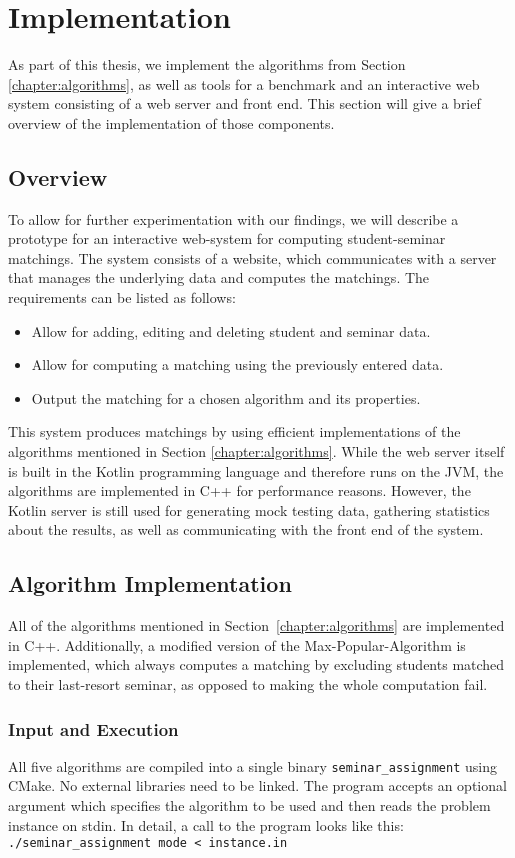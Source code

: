 \section{Implementation}

As part of this thesis, we implement the algorithms from Section \ref{chapter:algorithms}, as well as tools for a benchmark and an interactive web system consisting of a web server and front end. This section will give a brief overview of the implementation of those components.

\subsection{Overview}
To allow for further experimentation with our findings, we will describe a prototype for an interactive web-system for computing student-seminar matchings. The system consists of a website, which communicates with a server that manages the underlying data and computes the matchings. The requirements can be listed as follows:
\begin{itemize}
    \item Allow for adding, editing and deleting student and seminar data.
    \item Allow for computing a matching using the previously entered data.
    \item Output the matching for a chosen algorithm and its properties.
\end{itemize}
This system produces matchings by using efficient implementations of the algorithms mentioned in Section \ref{chapter:algorithms}. While the web server itself is built in the Kotlin programming language and therefore runs on the JVM, the algorithms are implemented in C++ for performance reasons. However, the Kotlin server is still used for generating mock testing data, gathering statistics about the results, as well as communicating with the front end of the system.

\subsection{Algorithm Implementation}
All of the algorithms mentioned in \mbox{Section \ref{chapter:algorithms}} are implemented in C++. Additionally, a modified version of the Max-Popular-Algorithm is implemented, which always computes a matching by excluding students matched to their last-resort seminar, as opposed to making the whole computation fail.

\subsubsection{Input and Execution}
All five algorithms are compiled into a single binary \lstinline{seminar_assignment} using CMake. No external libraries need to be linked. The program accepts an optional argument which specifies the algorithm to be used and then reads the problem instance on stdin. In detail, a call to the program looks like this: \lstinline{./seminar_assignment mode < instance.in} 


